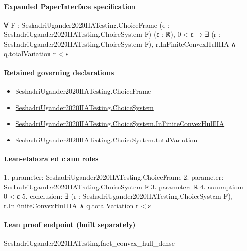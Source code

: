 \documentclass[10pt]{article}
\begin{document}
\paragraph{Expanded PaperInterface specification}
\begin{ReviewVerbatim}
∀ {F : SeshadriUgander2020IIATesting.ChoiceFrame} (q : SeshadriUgander2020IIATesting.ChoiceSystem F) (ε : ℝ),
  0 < ε → ∃ (r : SeshadriUgander2020IIATesting.ChoiceSystem F), r.InFiniteConvexHullIIA ∧ q.totalVariation r < ε
\end{ReviewVerbatim}

\paragraph{Retained governing declarations}
\begin{itemize}\raggedright
\item \hyperlink{paper-prerequisite-0b24d39c6f4d1898}{Seshadri\allowbreak{}Ugander2020\allowbreak{}IIA\allowbreak{}Testing.\allowbreak{}Choice\allowbreak{}Frame}
\item \hyperlink{paper-prerequisite-5dca52f4dfdd597a}{Seshadri\allowbreak{}Ugander2020\allowbreak{}IIA\allowbreak{}Testing.\allowbreak{}Choice\allowbreak{}System}
\item \hyperlink{governing-declaration-c69d3ba20f33890d}{Seshadri\allowbreak{}Ugander2020\allowbreak{}IIA\allowbreak{}Testing.\allowbreak{}Choice\allowbreak{}System.\allowbreak{}In\allowbreak{}Finite\allowbreak{}Convex\allowbreak{}Hull\allowbreak{}IIA}
\item \hyperlink{paper-prerequisite-f9aa4f6576ac42f4}{Seshadri\allowbreak{}Ugander2020\allowbreak{}IIA\allowbreak{}Testing.\allowbreak{}Choice\allowbreak{}System.\allowbreak{}total\allowbreak{}Variation}
\end{itemize}
\paragraph{Lean-elaborated claim roles}\begin{ReviewVerbatim}
1. parameter: SeshadriUgander2020IIATesting.ChoiceFrame
2. parameter: SeshadriUgander2020IIATesting.ChoiceSystem F
3. parameter: ℝ
4. assumption: 0 < ε
5. conclusion: ∃ (r : SeshadriUgander2020IIATesting.ChoiceSystem F), r.InFiniteConvexHullIIA ∧ q.totalVariation r < ε
\end{ReviewVerbatim}

\paragraph{Lean proof endpoint (built separately)}\begin{ReviewVerbatim}
SeshadriUgander2020IIATesting.fact_convex_hull_dense
\end{ReviewVerbatim}
\end{document}
